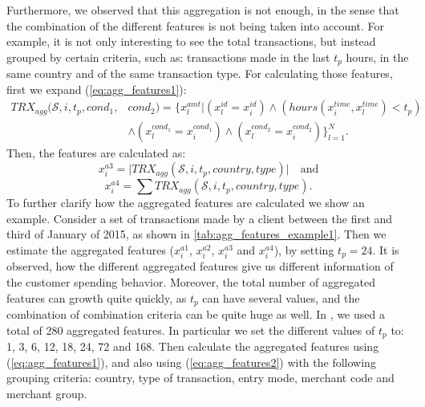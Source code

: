 	Furthermore, we observed that this aggregation is not enough, in the sense that the combination 
	of 	the different features is not being taken into account. For example, it is not only 
	interesting 	to see the total transactions, but instead grouped by 	certain criteria, such as: 
	transactions 	made in the last $t_p$ hours, in the same country 	and of the same transaction 
	type. For 	calculating those features, first we expand (\ref{eq:agg_features1}):
	\begin{align}\label{eq:agg_features2}
		TRX_{agg}(\mathcal{S},i, t_p, cond_1, & cond_2) = \bigg\{ x_l^{amt} \bigg\vert   
		\left(x_l^{id}=x_i^{id}\right) \wedge  \left(hours(x_i^{time},x_l^{time})< t_p\right) \nonumber 
		\\ 	&  \wedge \left(x_l^{cond_1} = x_i^{cond_1}\right) \wedge	\left(x_l^{cond_2} = 
		x_i^{cond_2}\right) \bigg\}_{l=1}^N.
		\end{align}
	Then, the features are calculated as:
	\[ x_i^{a3} = \vert TRX_{agg}(\mathcal{S},i, t_p, country, type) \vert \quad \text{and} \]
	\[  x_i^{a4} = \sum 	TRX_{agg}(\mathcal{S},i, t_p,country, type).	\]		
	To further clarify how the aggregated features are calculated we show an example. Consider a set 
	of transactions made by a client between the first and third of January of 2015, as shown in 
	\tablename{ 	\ref{tab:agg_features_example1}}. Then we estimate the aggregated features 
	($x_i^{a1}$, $x_i^{a2}$, $x_i^{a3}$ and $x_i^{a4}$), by setting $t_p=24$. It is observed, how the 
	different aggregated features give us different information of the customer spending behavior.
	Moreover, the total number of aggregated features can growth quite quickly, as $t_p$ can have 
	several values, and the combination of combination criteria can be quite huge as well.
	In \cite{CorreaBahnsen2013}, we used a total of 280 aggregated features. In particular we set the 
	different values of $t_p$ to: 1, 3, 6, 12, 18, 24, 72 and 168. Then calculate the aggregated 
	features 	using (\ref{eq:agg_features1}), and also using (\ref{eq:agg_features2}) with the 
	following  grouping criteria:	country, type of transaction, entry mode, merchant code and merchant 
group. 
		
